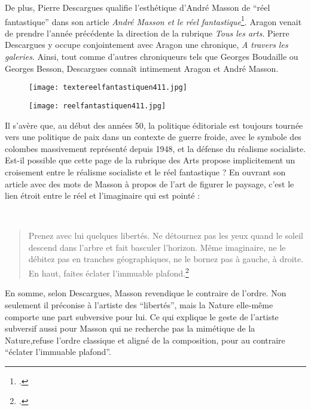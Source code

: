 De plus, Pierre Descargues qualifie l’esthétique d’André Masson de \enquote{réel fantastique} dans son article \emph{André Masson et le réel fantastique}\footcite{reelfantastique}. Aragon venait de  prendre l'année précédente la direction  de la rubrique \emph{Tous les arts}. Pierre Descargues y occupe conjointement avec Aragon une chronique, \emph{A travers les galeries}. Ainsi, tout comme d’autres chroniqueurs tels que Georges Boudaille ou Georges Besson, Descargues connaît intimement Aragon et André Masson. 

\begin{figure}[H]
   \centering
   \texttt{[image: textereelfantastiquen411.jpg]}
	\caption{\cite{reelfantastique}}\label{fig:Articlereelfantastique}
\end{figure}

\begin{figure}[H]
   \centering
   \texttt{[image: reelfantastiquen411.jpg]}
	\caption{\cite{reelfantastique}}\label{fig:Imagereelfantastique}
\end{figure}


	Il s'avère que, au début des années 50, la politique éditoriale est toujours tournée vers une politique de paix dans un contexte de guerre froide, avec le symbole des colombes massivement représenté depuis 1948, et la défense du réalisme socialiste. Est-il possible que cette page de la rubrique des Arts propose implicitement un croisement entre le réalisme socialiste et le réel fantastique ? En ouvrant son article avec des mots de Masson à propos de l’art de figurer le paysage, c’est le lien étroit entre le réel et l’imaginaire qui est pointé : 

 \begin{quote}
Prenez avec lui quelques libertés. Ne détournez pas les yeux quand le soleil descend dans l’arbre et fait basculer l’horizon. Même imaginaire, ne le débitez pas en tranches géographiques, ne le bornez pas à gauche, à droite. En haut, faites éclater l’immuable plafond.\footcite{reelfantastique}\end{quote}

	 En somme, selon Descargues, Masson revendique le contraire de l’ordre. Non seulement il préconise à l’artiste des \enquote{libertés}, mais la Nature elle-même comporte une part subversive pour lui. Ce qui explique le geste de l’artiste subversif aussi pour Masson qui ne recherche pas la mimétique de la Nature,refuse l'ordre classique et aligné de la composition, pour au contraire \enquote{éclater l’immuable plafond}.

